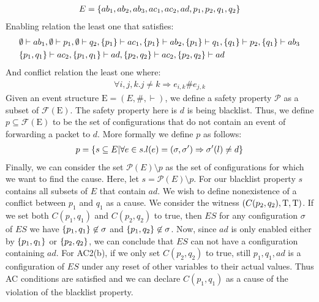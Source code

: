 \begin{example}
\begin{align*}
        E = \{ab_1,ab_2,ab_3,ac_1,ac_2,ad,p_1,p_2,q_1,q_2\} \\
    \end{align*}
    Enabling relation the least one that satisfies:
    \begin{align*}
        & \emptyset \vdash ab_1, \emptyset \vdash p_1, \emptyset \vdash q_2,
        \{p_1\} \vdash ac_1, \{p_1\} \vdash ab_2, \{p_1\} \vdash q_1,
        \{q_1\} \vdash p_2, \{q_1\} \vdash ab_3 \\
        & \{p_1,q_1\} \vdash ac_2, \{p_1,q_1\} \vdash ad,
        \{p_2,q_2\} \vdash ac_2, \{p_2,q_2\} \vdash ad
    \end{align*}
    And conflict relation the least one where:
    \begin{align*}
        \forall i,j,k. j \neq k \Rightarrow e_{i,k} \# e_{j,k} 
    \end{align*}
    Given an event structure $\mathrm{E} = (E,\#,\vdash)$, we define a safety
    property $\mathcal{P}$ as a subset of $\mathcal{F}(\mathrm{E})$.
    The safety property here is $d$ is being blacklist. 
    Thus, we define $ p \subseteq \mathcal{F}(\mathrm{E})$ to be the set of 
    configurations that do not contain an event of forwarding a packet to $d$.
    More formally we define $p$ as follows:
    \begin{align*}
        p = \{s \subseteq E| \forall e \in s.  l(e) = (\sigma, \sigma')
         \Rightarrow \sigma'(l) \neq d \}
    \end{align*}
    Finally, we can consider the set $\mathcal{P}(E) \setminus p$ as the 
    set of configurations for which we want to find the cause.
    Here, let $s = \mathcal{P}(E) \setminus p$.
    For our blacklist property $s$ contains all subsets of $E$ that contain $ad$.
    We wish to define nonexistence of a conflict between $p_1$ and $q_1$ 
    as a cause.
    We consider the witness $(C(p_2,q_2),\mathrm{T},\mathrm{T})$.
    If we set both $C(p_1,q_1)$ and $C(p_2,q_2)$ to true, then $ES$ for any 
    configuration $\sigma$ of $ES$ we have $\{p_1,q_1\} \not \in \sigma$ and
    $\{p_1,q_2\} \not \in \sigma$. Now, since $ad$ is only enabled either by
    $\{p_1,q_1\}$ or $\{p_2,q_2\}$, we can conclude that $ES$ can not have a
    configuration containing $ad$.
    For AC2(b), if we only set $C(p_2,q_2)$ to true, still ${p_1,q_1,ad}$ is 
    a configuration of $ES$ under any reset of other variables to their actual 
    values.
    Thus AC conditions are satisfied and we can declare $C(p_1,q_1)$ as a cause of
    the violation of the blacklist property.

\end{example}